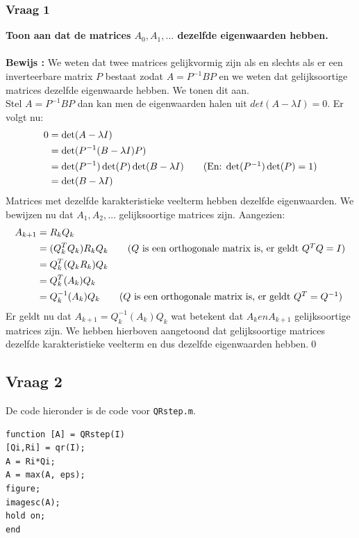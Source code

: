 \documentclass{article}
\begin{document}
\subsubsection*{Vraag 1}
\textbf{Toon aan dat de matrices $A_0, A_1, \dots$ dezelfde eigenwaarden hebben.}\\
\\
\noindent\textbf{Bewijs :}
We weten dat twee matrices gelijkvormig zijn als en slechts als er een inverteerbare matrix $P$ bestaat zodat $A=P^{-1}BP$ en we weten dat gelijksoortige matrices dezelfde eigenwaarde hebben. We tonen dit aan.\\
Stel $A=P^{-1}BP$ dan kan men de eigenwaarden halen uit $det(A- \lambda I) = 0 $. Er volgt nu:
\begin{align*}
    0 &= \det(A- \lambda I) \\
    &= \det(P^{-1}(B- \lambda I)P)\\
    &= \det(P^{-1})\det(P)\det(B - \lambda I) \tag{En: $\det(P^{-1})\det(P) = 1$} \\
    &= \det(B - \lambda I)
\end{align*}
Matrices met dezelfde karakteristieke veelterm hebben dezelfde eigenwaarden. We bewijzen nu dat $A_1, A_2,\dots$ gelijksoortige matrices zijn. Aangezien:
\begin{align*}
    A_{k+1} &= R_k Q_k \\
    &= (Q^T_k Q_k)R_kQ_k \tag{$Q$ is een orthogonale matrix is, er geldt $Q^T Q = I$}\\
    &= Q^T_k (Q_kR_k)Q_k\\
    &= Q^T_k (A_k)Q_k\\
    &= Q^{-1}_k (A_k)Q_k \tag{$Q$ is een orthogonale matrix is, er geldt $Q^T=Q^{-1}$}
\end{align*}
Er geldt nu dat $A_{k+1} = Q^{-1}_k (A_k)Q_k$ wat betekent dat $A_k en A_{k+1}$ gelijksoortige matrices zijn. We hebben hierboven aangetoond dat gelijksoortige matrices dezelfde karakteristieke veelterm en dus dezelfde eigenwaarden hebben.\qed

\subsection*{Vraag 2}
De code hieronder is de code voor \texttt{QRstep.m}.
\vspace{-5mm}
\begin{lstlisting}
function [A] = QRstep(I)
[Qi,Ri] = qr(I); 
A = Ri*Qi;
A = max(A, eps);
figure;
imagesc(A);
hold on;
end
\end{lstlisting}
\end{document}
